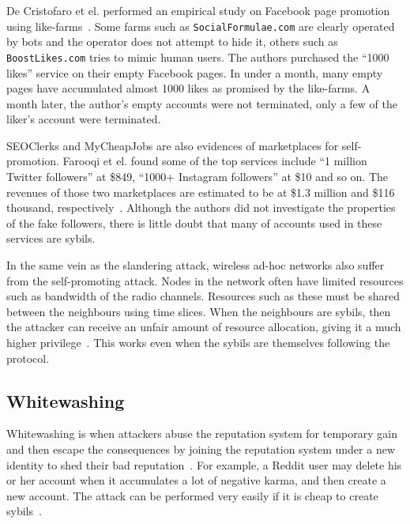
De Cristofaro et el. performed an empirical study on Facebook page promotion
using like-farms~\cite{de2014paying}. Some farms such as
\verb!SocialFormulae.com! are clearly operated by bots and the operator does not
attempt to hide it, others such as \verb!BoostLikes.com! tries to mimic human
users. The authors purchased the ``1000 likes'' service on their empty Facebook
pages. In under a month, many empty pages have accumulated almost 1000 likes as
promised by the like-farms. A month later, the author's empty accounts were not
terminated, only a few of the liker's account were terminated.


SEOClerks and MyCheapJobs are also evidences of marketplaces for self-promotion.
Farooqi et el. found some of the top services include ``1 million Twitter
followers'' at \$849, ``1000+ Instagram followers'' at \$10 and so on. The
revenues of those two marketplaces are estimated to be at \$1.3 million and
\$116 thousand, respectively~\cite{farooqi2015characterizing}. Although the
authors did not investigate the properties of the fake followers, there is
little doubt that many of accounts used in these services are sybils.

In the same vein as the slandering attack, wireless ad-hoc networks also suffer
from the self-promoting attack. Nodes in the network often have limited
resources such as bandwidth of the radio channels. Resources such as these must
be shared between the neighbours using time slices. When the neighbours are
sybils, then the attacker can receive an unfair amount of resource allocation,
giving it a much higher privilege~\cite{newsome2004sybil}. This works even when
the sybils are themselves following the protocol.

\subsection{Whitewashing}
Whitewashing is when attackers abuse the reputation system for temporary gain
and then escape the consequences by joining the reputation system under a new
identity to shed their bad reputation~\cite{marti2006taxonomy}. For example, a
Reddit user may delete his or her account when it accumulates a lot of negative
karma, and then create a new account. The attack can be performed very easily if
it is cheap to create sybils~\cite{hoffman2009survey}.

